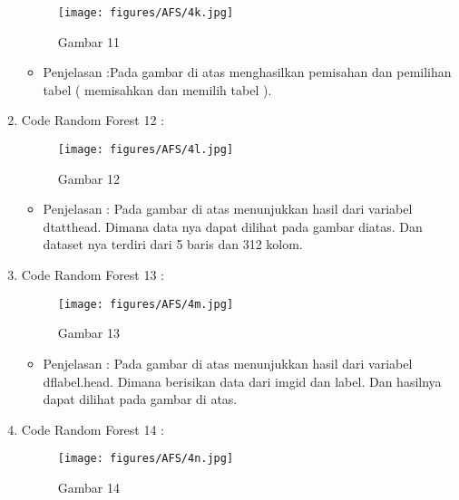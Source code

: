 \begin{enumerate}
\begin{figure}[ht]
\centering
\texttt{[image: figures/AFS/4k.jpg]}
\caption{Gambar 11}
\label{contoh}
\end{figure}
\par
\begin{itemize}
\item Penjelasan :Pada gambar di atas menghasilkan pemisahan dan pemilihan tabel ( memisahkan dan memilih tabel ). 
\par
\par
\end{itemize}
\item Code Random Forest 12 :
\par
\begin{figure}[ht]
\centering
\texttt{[image: figures/AFS/4l.jpg]}
\caption{Gambar 12}
\label{contoh}
\end{figure}
\par
\begin{itemize}
\item Penjelasan : Pada gambar di atas menunjukkan hasil dari variabel dtatthead. Dimana data nya dapat dilihat pada gambar diatas. Dan dataset nya terdiri dari 5 baris dan 312 kolom.
\par
\par
\end{itemize}
\item Code Random Forest 13 :
\par
\begin{figure}[ht]
\centering
\texttt{[image: figures/AFS/4m.jpg]}
\caption{Gambar 13}
\label{contoh}
\end{figure}
\par
\begin{itemize}
\item Penjelasan : Pada gambar di atas menunjukkan hasil dari variabel dflabel.head. Dimana berisikan data dari imgid dan label. Dan hasilnya dapat dilihat pada gambar di atas.
\par
\par
\end{itemize}
\item Code Random Forest 14 :
\par
\begin{figure}[ht]
\centering
\texttt{[image: figures/AFS/4n.jpg]}
\caption{Gambar 14}
\label{contoh}
\end{figure}
\par
\begin{itemize}

\end{itemize}
\end{enumerate}
